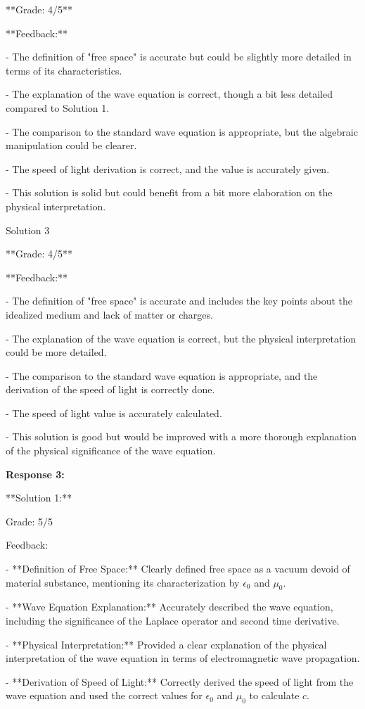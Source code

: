 \documentclass[a4paper,11pt]{article}
\begin{document}
**Grade: 4/5**

**Feedback:**

- The definition of "free space" is accurate but could be slightly more detailed in terms of its characteristics.

- The explanation of the wave equation is correct, though a bit less detailed compared to Solution 1.

- The comparison to the standard wave equation is appropriate, but the algebraic manipulation could be clearer.

- The speed of light derivation is correct, and the value is accurately given.

- This solution is solid but could benefit from a bit more elaboration on the physical interpretation.

Solution 3

**Grade: 4/5**

**Feedback:**

- The definition of "free space" is accurate and includes the key points about the idealized medium and lack of matter or charges.

- The explanation of the wave equation is correct, but the physical interpretation could be more detailed.

- The comparison to the standard wave equation is appropriate, and the derivation of the speed of light is correctly done.

- The speed of light value is accurately calculated.

- This solution is good but would be improved with a more thorough explanation of the physical significance of the wave equation.

\bigskip
\textbf{Response 3:}

**Solution 1:**

Grade: 5/5

Feedback:

- **Definition of Free Space:** Clearly defined free space as a vacuum devoid of material substance, mentioning its characterization by \(\epsilon_0\) and \(\mu_0\).

- **Wave Equation Explanation:** Accurately described the wave equation, including the significance of the Laplace operator and second time derivative.

- **Physical Interpretation:** Provided a clear explanation of the physical interpretation of the wave equation in terms of electromagnetic wave propagation.

- **Derivation of Speed of Light:** Correctly derived the speed of light from the wave equation and used the correct values for \(\epsilon_0\) and \(\mu_0\) to calculate \( c \).
\end{document}
